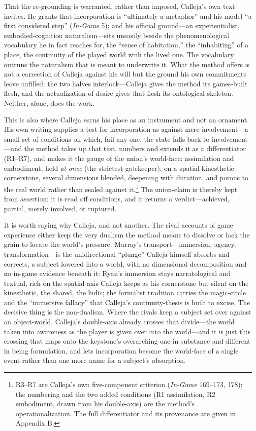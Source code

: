 \documentclass{article}
\begin{document}
That the re-grounding is warranted, rather than imposed, Calleja's own text invites. He grants that incorporation is ``ultimately a metaphor'' and his model ``a first considered step'' (\textit{In-Game} 5); and his official ground---an experientialist, embodied-cognition naturalism---sits uneasily beside the phenomenological vocabulary he in fact reaches for, the ``sense of habitation,'' the ``inhabiting'' of a place, the continuity of the played world with the lived one. The vocabulary outruns the naturalism that is meant to underwrite it. What the method offers is not a correction of Calleja against his will but the ground his own commitments leave unfilled: the two halves interlock---Calleja gives the method its games-built flesh, and the actualization of desire gives that flesh its ontological skeleton. Neither, alone, does the work.

This is also where Calleja earns his place as an instrument and not an ornament. His own writing supplies a test for incorporation as against mere involvement---a small set of conditions on which, fail any one, the state falls back to involvement---and the method takes up that test, numbers and extends it as a differentiator (R1--R7), and makes it the gauge of the union's world-face: assimilation and embodiment, held \textit{at once} (the strictest gatekeeper), on a spatial-kinesthetic cornerstone, several dimensions blended, deepening with duration, and porous to the real world rather than sealed against it.\footnote{R3--R7 are Calleja's own five-component criterion (\textit{In-Game} 169--173, 178); the numbering and the two added conditions (R1 assimilation, R2 embodiment, drawn from his double-axis) are the method's operationalization. The full differentiator and its provenance are given in Appendix B.} The union-claim is thereby kept from assertion: it is read off conditions, and it returns a verdict---achieved, partial, merely involved, or ruptured.

It is worth saying why Calleja, and not another. The rival accounts of game experience either keep the very dualism the method means to dissolve or lack the grain to locate the world's pressure. Murray's transport---immersion, agency, transformation---is the unidirectional ``plunge'' Calleja himself absorbs and corrects, a subject lowered into a world, with no dimensional decomposition and no in-game evidence beneath it; Ryan's immersion stays narratological and textual, rich on the spatial axis Calleja keeps as his cornerstone but silent on the kinesthetic, the shared, the ludic; the formalist tradition carries the magic-circle and the ``immersive fallacy'' that Calleja's continuity-thesis is built to excise. The decisive thing is the non-dualism. Where the rivals keep a subject set over against an object-world, Calleja's double-axis already crosses that divide---the world taken into awareness as the player is given over into the world---and it is just this crossing that maps onto the keystone's overarching one in substance and different in being formulation, and lets incorporation become the world-face of a single event rather than one more name for a subject's absorption.
\end{document}
